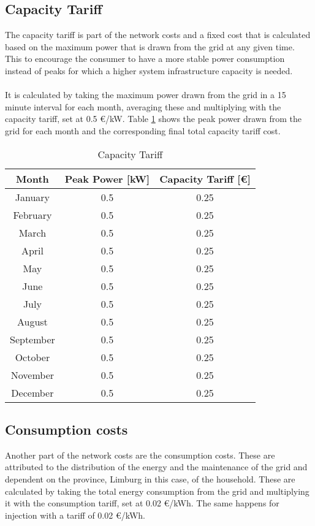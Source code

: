 \subsection{Capacity Tariff}
\label{sec:capacity-tariff}
The capacity tariff is part of the network costs and a fixed cost that is calculated based on the maximum power that is drawn from the grid at any given time. This to encourage the consumer to have a more stable power consumption instead of peaks for which a higher system infrastructure capacity is needed.
\\ \\
It is calculated by taking the maximum power drawn from the grid in a 15 minute interval for each month, averaging these and multiplying with the capacity tariff, set at 0.5 \euro/kW. Table \ref{tab:capacity-tariff} shows the peak power drawn from the grid for each month and the corresponding final total capacity tariff cost.

\begin{table}[H]
\centering
\begin{tabular}{|c|c|c|}
\hline
Month & Peak Power [kW] & Capacity Tariff [€] \\ \hline
January & 0.5 & 0.25 \\ \hline
February & 0.5 & 0.25 \\ \hline
March & 0.5 & 0.25 \\ \hline
April & 0.5 & 0.25 \\ \hline
May & 0.5 & 0.25 \\ \hline
June & 0.5 & 0.25 \\ \hline
July & 0.5 & 0.25 \\ \hline
August & 0.5 & 0.25 \\ \hline
September & 0.5 & 0.25 \\ \hline
October & 0.5 & 0.25 \\ \hline
November & 0.5 & 0.25 \\ \hline
December & 0.5 & 0.25 \\ \hline
\end{tabular}
\caption{Capacity Tariff}
\label{tab:capacity-tariff}
\end{table}

\subsection{Consumption costs}
\label{sec:consumption-costs}
Another part of the network costs are the consumption costs. These are attributed to the distribution of the energy and the maintenance of the grid and dependent on the province, Limburg in this case, of the household. These are calculated by taking the total energy consumption from the grid and multiplying it with the consumption tariff, set at 0.02 \euro/kWh. The same happens for injection with a tariff of 0.02 \euro/kWh. 

